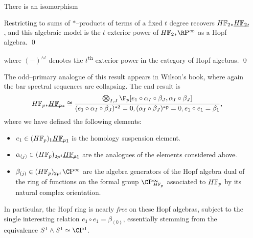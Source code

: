 \begin{corollary}\label{CalculationOfUnstableSteenrodHopfRing}
There is an isomorphism
\begin{center}
Restricting to sums of \(\ast\)--products of terms of a fixed \(t\) degree recovers \(\HFtwo_* \OS{\HFtwo}{t}\), and this algebraic model is the \(t\){\th} exterior power of \(\HFtwo_* \RP^\infty\) as a Hopf algebra. \qed
\end{center}

where \((-)^{\wedge t}\) denotes the \(t\)\textsuperscript{th} exterior power in the category of Hopf algebras. \qed
\end{corollary}

\begin{remark}
The odd--primary analogue of this result appears in Wilson's book, where again the bar spectral sequences are collapsing.  The end result is \[\HFp_* \OS{\HFp}{*} \cong \frac{\bigotimes_{I, J} \F_p[e_1 \circ \alpha_I \circ \beta_J, \alpha_I \circ \beta_J]}{(e_1 \circ \alpha_I \circ \beta_J)^{\ast 2} = 0, (\alpha_I \circ \beta_J)^{\ast p} = 0, e_1 \circ e_1 = \beta_1},\] where we have defined the following elements:
\begin{itemize}
\item \(e_1 \in (\HFp)_1 \OS{\HFp}{1}\) is the homology suspension element.
\item \(\alpha_{(j)} \in (\HFp)_{2p^j} \OS{\HFp}{1}\) are the analogues of the elements considered above.
\item \(\beta_{(j)} \in (\HFp)_{2p^j} \CP^\infty\) are the algebra generators of the Hopf algebra dual of the ring of functions on the formal group \(\CP^\infty_{\HFp}\) associated to \(\HFp\) by its natural complex orientation.
\end{itemize}
In particular, the Hopf ring is nearly \emph{free} on these Hopf algebras, subject to the single interesting relation \(e_1 \circ e_1 = \beta_{(0)}\), essentially stemming from the equivalence \(S^1 \sm S^1 \simeq \CP^1\).
\end{remark}

